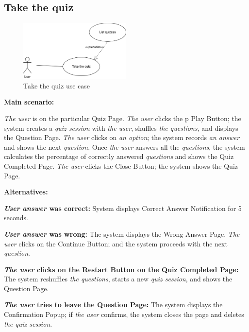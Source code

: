 \documentclass[
    english, %
]{VUMIFPSkursinis}
\begin{document}
\pagebreak

\subsection{Take the quiz}

\begin{figure}[ht]
    \centering
    \includegraphics[width=0.5\textwidth]{../lab3diags/take-quiz.drawio.png}
    \caption{Take the quiz use case}
    \label{take-quiz}
\end{figure}

\noindent\textbf{\fontsize{13}{15}\selectfont Main scenario:}

\textit{The user} is on the particular Quiz Page. \textit{The user} clicks the p
Play Button; the system creates a \textit{quiz session} with \textit{the user}, shuffles \textit{the questions}, and displays the Question Page. \textit{The user} clicks on \textit{an option}; the system records \textit{an answer} and shows the next \textit{question}. Once \textit{the user} answers all the \textit{questions}, the system calculates the percentage of correctly answered \textit{questions} and shows the Quiz Completed Page. \textit{The user} clicks the Close Button; the system shows the Quiz Page.

\noindent\textbf{\fontsize{13}{15}\selectfont Alternatives:}

\textbf{\textit{User answer} was correct:} System displays Correct Answer Notification for 5 seconds.

\textbf{\textit{User answer} was wrong:} The system displays the Wrong Answer Page. \textit{The user} clicks on the Continue Button; and the system proceeds with the next \textit{question}.

\textbf{\textit{The user} clicks on the Restart Button on the Quiz Completed Page:} The system reshuffles \textit{the questions}, starts a new \textit{quiz session}, and shows the Question Page.

\textbf{\textit{The user} tries to leave the Question Page:} The system displays the Confirmation Popup; if \textit{the user} confirms, the system closes the page and deletes \textit{the quiz session}.
\end{document}
